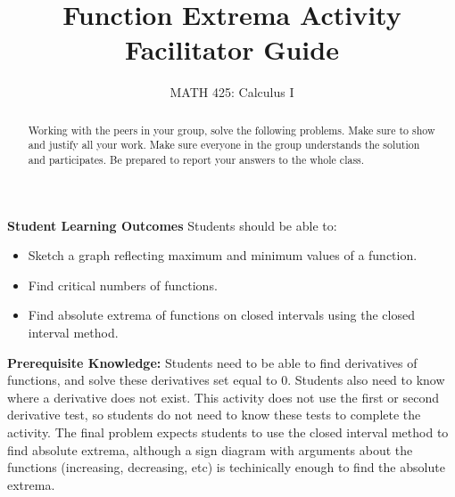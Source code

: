 \documentclass{ximera}
\title{Function Extrema Activity Facilitator Guide}
\author{MATH 425: Calculus I}
\begin{document}
\begin{abstract}
   Working with the peers in your group, solve the following problems. Make sure to show and justify all your work. Make sure everyone in the group understands the solution and participates. Be prepared to report your answers to the whole class. 
\end{abstract}
\maketitle

\textbf{Student Learning Outcomes}
Students should be able to: 
    \begin{itemize}
        \item Sketch a graph reflecting maximum and minimum values of a function.
        \item Find critical numbers of functions.
        \item Find absolute extrema of functions on closed intervals using the closed interval method.
    \end{itemize}

\textbf{Prerequisite Knowledge:} Students need to be able to find derivatives of functions, and solve these derivatives set equal to 0.  Students also need to know where a derivative does not exist.  This activity does not use the first or second derivative test, so students do not need to know these tests to complete the activity.  The final problem expects students to use the closed interval method to find absolute extrema, although a sign diagram with arguments about the functions (increasing, decreasing, etc) is techinically enough to find the absolute extrema.
\end{document}
